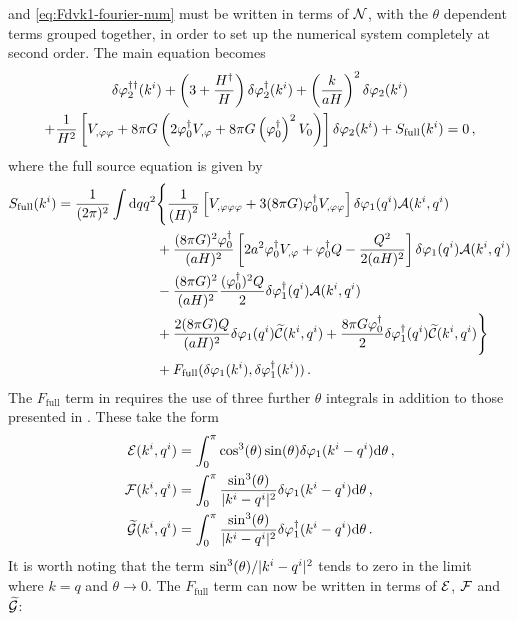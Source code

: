  and \eqref{eq:Fdvk1-fourier-num} must be written in
terms of $\mathcal{N}$, with the $\theta$ dependent terms grouped together, in order to set
up the numerical system completely at second order. 
The main equation
becomes
\begin{multline}
 \label{eq:fullso-res}
\ddN{\dvp2}(\kvi) + \left(3 + \frac{\dN{H}}{H}\right) \dN{\dvp2}(\kvi) +
\left(\frac{k}{aH}\right)^2 \dvp2(\kvi) \\
% 
+ \frac{1}{H^2}\left[ \Upp + 8\pi G\left(2\dN{\vp_0}\Uphi + 8\pi G
\left(\dN{\vp_0}\right)^2 \U \right)\right] \dvp2(\kvi)
% 
+ S_\mathrm{full}(\kvi) = 0\,,
\end{multline}
% 
where the full source equation is given by
% 
\begin{align}
\label{eq:fullsrc-res}
S_\mathrm{full}(\kvi) = \frac{1}{(2\pi)^2}\int \d q q^2 &\Bigg\{ 
% 
\frac{1}{\left(H\right)^2} \left[ \Uppp + 3(8\pi G)\dN{\vp_0}\Upp\right]
 \dvp1(\qvi) \A(\kvi, \qvi) \nonumber \\
% 
&+\frac{(8\pi G)^2 \dN{\vp_0}}{(aH)^2}\left[ 2a^2\dN{\vp_0}\Uphi +\dN{\vp_0}Q
-\frac{Q^2}{2(aH)^2}\right] \dvp1(\qvi) \A(\kvi, \qvi) \nonumber \\
% 
&- \frac{(8\pi G)^2}{(aH)^2}\frac{(\dN{\vp_0})^2 Q}{2} \dN{\dvp1}(\qvi)
\A(\kvi, \qvi) \nonumber \\
% 
&+ \frac{2(8\pi G)Q}{(aH)^2} \dvp1(\qvi)\wt{\C}(\kvi, \qvi) 
% 
+ \frac{8\pi G \dN{\vp_0}}{2} \dN{\dvp1}(\qvi) \wt{\C}(\kvi, \qvi) \Bigg\} \nonumber
\\
% 
&+ F_\mathrm{full}(\dvp1(\kvi), \dN{\dvp1}(\kvi))\,.
\end{align}
% 
The $F_\mathrm{full}$ term in  requires the use of three further
$\theta$
integrals in addition to those presented in . These take the form
% 
\begin{align}
\label{eq:efg-terms-res}
 \E(\kvi, \qvi) &= \int_0^\pi \cos^3(\theta) \sin(\theta) \dvp1(\kvi-\qvi)\d \theta
\,,\nonumber \\
% 
\F(\kvi, \qvi) &= \int_0^\pi \frac{\sin^3(\theta)}{|\kvi-\qvi|^2} \dvp1(\kvi-\qvi)\d
\theta \,,\nonumber \\
% 
\wt{\G}(\kvi, \qvi) &= \int_0^\pi \frac{\sin^3(\theta)}{|\kvi-\qvi|^2}
\dN{\dvp1}(\kvi-\qvi)\d \theta \,.
\end{align}
% 
It is worth noting that the term $\sin^3(\theta)/|k^i-q^i|^2$ tends to zero in the
limit where $k=q$ and
$\theta\rightarrow 0$.
% 
The $F_\mathrm{full}$ term can now be written in terms of $\mathcal{E}$, $\mathcal{F}$ and $\widetilde{\mathcal{G}}$:
